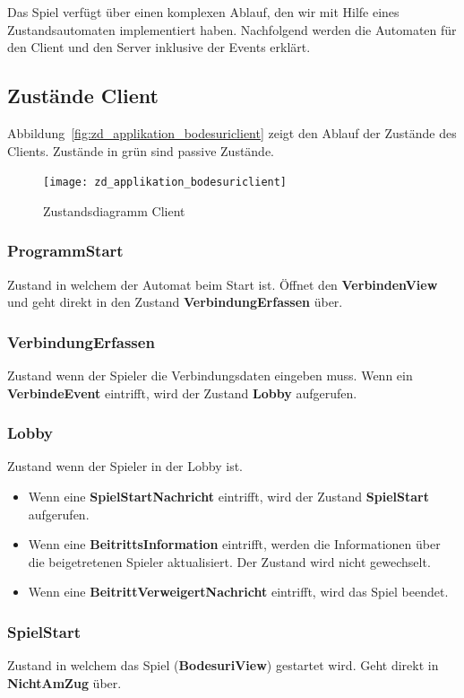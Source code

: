 \documentclass[12pt,halfparskip]{scrartcl}
\begin{document}
Das Spiel verfügt über einen komplexen Ablauf, den wir mit Hilfe eines Zustandsautomaten implementiert haben. Nachfolgend werden die Automaten für den Client und den Server inklusive der Events erklärt.

\subsection{Zustände Client}

Abbildung~\vref{fig:zd_applikation_bodesuriclient} zeigt den Ablauf der Zustände des Clients. Zustände in grün sind passive Zustände.
\begin{figure}[h]
	\centering
	\texttt{[image: zd\_applikation\_bodesuriclient]}
	\caption{Zustandsdiagramm Client}
	\label{fig:zd_applikation_bodesuriclient}
\end{figure}

\subsubsection{ProgrammStart}
\label{ssub:programmstart}
Zustand in welchem der Automat beim Start ist. Öffnet den \textbf{VerbindenView} und geht direkt in den Zustand \textbf{VerbindungErfassen} über.


\subsubsection{VerbindungErfassen}
\label{ssub:verbinungerfassen}
Zustand wenn der Spieler die Verbindungsdaten eingeben muss. Wenn ein \textbf{VerbindeEvent} eintrifft, wird der Zustand \textbf{Lobby} aufgerufen.

\subsubsection{Lobby}
\label{ssub:lobby}
Zustand wenn der Spieler in der Lobby ist.
\begin{itemize}
	\item Wenn eine \textbf{SpielStartNachricht} eintrifft, wird der Zustand \textbf{SpielStart} aufgerufen.
	\item Wenn eine \textbf{BeitrittsInformation} eintrifft, werden die Informationen über die beigetretenen Spieler aktualisiert. Der Zustand wird nicht gewechselt.
	\item Wenn eine \textbf{BeitrittVerweigertNachricht} eintrifft, wird das Spiel beendet.
\end{itemize}

\subsubsection{SpielStart}
\label{ssub:spielstart}
Zustand in welchem das Spiel (\textbf{BodesuriView}) gestartet wird. Geht direkt in \textbf{NichtAmZug} über.
\end{document}

